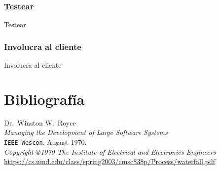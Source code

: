 \documentclass{beamer}
\begin{document}
\subsubsection{Testear}

\begin{frame}{Testear}

\end{frame}


\subsubsection{Involucra al cliente}

\begin{frame}{Involucra al cliente}

\end{frame}


\section{Bibliografía}

\begin{frame}[fragile]
\begin{thebibliography}{9}
  \footnotesize
  Dr.\ Winston W.\ Royce \\
  \emph{Managing the Development of Large Software Systems} \\
  \texttt{IEEE Wescon},
  August 1970. \\
  \textit{Copyright ®1970 The Institute of Electrical and Electronics Engineers} \\
  {\scriptsize\url{https://cs.umd.edu/class/spring2003/cmsc838p/Process/waterfall.pdf}}
\end{thebibliography}
\end{frame}
\end{document}
